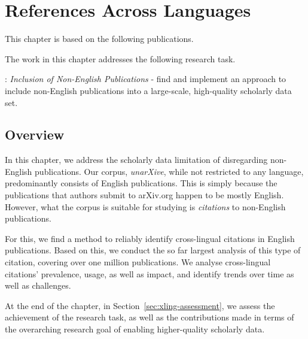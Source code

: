 \chapter{References Across Languages}
\label{chp:xling}

This chapter is based on the following publications.
\begin{infobox-pub}
\end{infobox-pub}

\begin{infobox-pub}
\end{infobox-pub}

The work in this chapter addresses the following research task.

\begin{rtlist}
    \item[\rtmark{3}:] \textit{Inclusion of Non-English Publications} - find and implement an approach to include non-English publications into a large-scale, high-quality scholarly data set.
\end{rtlist}

\section{Overview}
In this chapter, we address the scholarly data limitation of disregarding non-English publications. Our corpus, \emph{unarXive}, while not restricted to any language, predominantly consists of English publications. This is simply because the publications that authors submit to arXiv.org happen to be mostly English. However, what the corpus is suitable for studying is \emph{citations} to non-English publications.

For this, we find a method to reliably identify cross-lingual citations in English publications. Based on this, we conduct the so far largest analysis of this type of citation, covering over one million publications. We analyse cross-lingual citations' prevalence, usage, as well as impact, and identify trends over time as well as challenges.

At the end of the chapter, in Section~\ref{sec:xling-assessment}, we assess the achievement of the research task, as well as the contributions made in terms of the overarching research goal of enabling higher-quality scholarly data.

